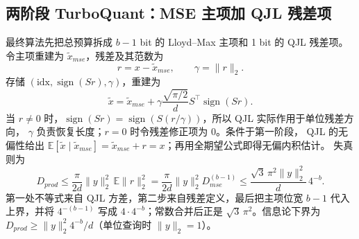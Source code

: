 \subsection{两阶段 TurboQuant：MSE 主项加 QJL 残差项}

最终算法先把总预算拆成 $b-1$ bit 的 Lloyd--Max 主项和 1 bit 的 QJL 残差项。
令主项重建为 $\widetilde x_{mse}$，残差及其范数为
\begin{equation}
  r=x-\widetilde x_{mse},\qquad \gamma=\|r\|_2.
  \label{eq:38-tq-residual}
\end{equation}
存储 $(\mathrm{idx},\operatorname{sign}(Sr),\gamma)$，重建为
\begin{equation}
  \widetilde x=\widetilde x_{mse}+
  \gamma\frac{\sqrt{\pi/2}}dS^{\top}\operatorname{sign}(Sr).
  \label{eq:38-tq-two-stage}
\end{equation}
当 $r\ne0$ 时，$\operatorname{sign}(Sr)=
\operatorname{sign}(S(r/\gamma))$，所以 QJL 实际作用于单位残差方向，
$\gamma$ 负责恢复长度；$r=0$ 时令残差修正项为 0。条件于第一阶段，
QJL 的无偏性给出
$\mathbb E[\widetilde x\mid\widetilde x_{mse}]
=\widetilde x_{mse}+r=x$；再用全期望公式即得无偏内积估计。
失真则为
\begin{equation}
  D_{prod}\le\frac{\pi}{2d}\|y\|_2^2\,\mathbb E\|r\|_2^2
  =\frac{\pi}{2d}\|y\|_2^2D_{mse}^{(b-1)}
  \le\frac{\sqrt3\,\pi^2\|y\|_2^2}{d}\,4^{-b}.
  \label{eq:38-tq-prod-bound}
\end{equation}
第一处不等式来自 QJL 方差，第二步来自残差定义，最后把主项位宽
$b-1$ 代入上界，并将 $4^{-(b-1)}$ 写成 $4\cdot4^{-b}$；常数合并后正是
$\sqrt3\,\pi^2$。信息论下界为
$D_{prod}\ge\|y\|_2^2 4^{-b}/d$（单位查询时 $\|y\|_2=1$）。


